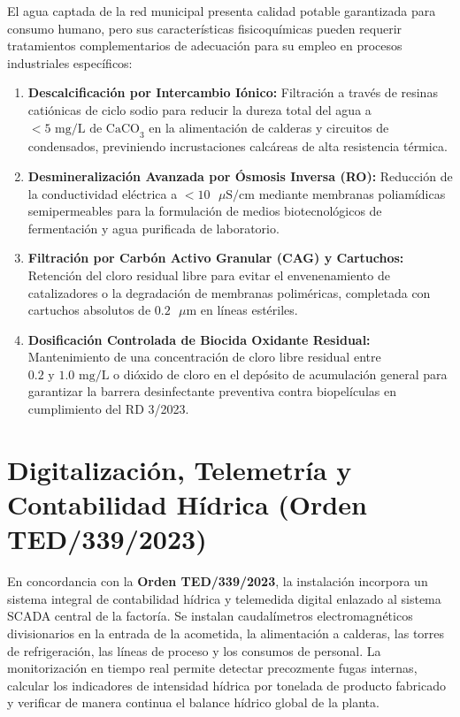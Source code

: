 \documentclass{report}
\begin{document}
El agua captada de la red municipal presenta calidad potable garantizada para consumo humano, pero sus características fisicoquímicas pueden requerir tratamientos complementarios de adecuación para su empleo en procesos industriales específicos:
\begin{enumerate}
    \item \textbf{Descalcificación por Intercambio Iónico:} Filtración a través de resinas catiónicas de ciclo sodio para reducir la dureza total del agua a $< 5\text{ mg/L de CaCO}_3$ en la alimentación de calderas y circuitos de condensados, previniendo incrustaciones calcáreas de alta resistencia térmica.
    \item \textbf{Desmineralización Avanzada por Ósmosis Inversa (RO):} Reducción de la conductividad eléctrica a $< 10\text{ }\mu\text{S/cm}$ mediante membranas poliamídicas semipermeables para la formulación de medios biotecnológicos de fermentación y agua purificada de laboratorio.
    \item \textbf{Filtración por Carbón Activo Granular (CAG) y Cartuchos:} Retención del cloro residual libre para evitar el envenenamiento de catalizadores o la degradación de membranas poliméricas, completada con cartuchos absolutos de $0.2\text{ }\mu\text{m}$ en líneas estériles.
    \item \textbf{Dosificación Controlada de Biocida Oxidante Residual:} Mantenimiento de una concentración de cloro libre residual entre $0.2\text{ y }1.0\text{ mg/L}$ o dióxido de cloro en el depósito de acumulación general para garantizar la barrera desinfectante preventiva contra biopelículas en cumplimiento del RD 3/2023.
\end{enumerate}

\section[Digitalización y Telemetría Hídrica (Orden TED/339/2023)]{Digitalización, Telemetría y Contabilidad Hídrica (Orden TED/339/2023)}

En concordancia con la \textbf{Orden TED/339/2023}, la instalación incorpora un sistema integral de contabilidad hídrica y telemedida digital enlazado al sistema SCADA central de la factoría. Se instalan caudalímetros electromagnéticos divisionarios en la entrada de la acometida, la alimentación a calderas, las torres de refrigeración, las líneas de proceso y los consumos de personal. La monitorización en tiempo real permite detectar precozmente fugas internas, calcular los indicadores de intensidad hídrica por tonelada de producto fabricado y verificar de manera continua el balance hídrico global de la planta.
\end{document}
